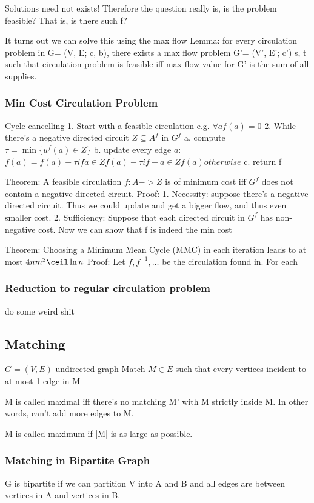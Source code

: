 \documentclass{article}
\begin{document}
Solutions need not exists!
Therefore the question really is, is the problem feasible?  That is, is there
such f?

It turns out we can solve this using the max flow
Lemma: for every circulation problem in G= (V, E; c, b), there exists a max flow
problem G'= (V', E'; c') s, t such that circulation problem is feasible iff max
flow value for G' is the sum of all supplies.


\subsubsection{Min Cost Circulation Problem}
Cycle cancelling
1. Start with a feasible circulation e.g. $\forall a f(a) = 0$
2. While there's a negative directed circuit $Z\subseteq A^f$ in $G^f$
   a. compute $\tau = \min \{u^f(a) \in Z\}$
   b. update every edge $a$: $f(a) = f(a) + \tau if a \in Z f(a) - \tau if -a \in Z f(a) otherwise$
   c. return f

Theorem: A feasible circulation $f: A -> Z$ is of minimum cost iff
$G^f$ does not contain a negative directed circuit.
Proof:
1. Necessity: suppose there's a negative directed circuit. Thus we
could update and get a bigger flow, and thus even smaller cost.
2. Sufficiency: Suppose that each directed circuit in $G^f$ has non-negative cost.  Now we can show that f is indeed the min cost

Theorem: Choosing a Minimum Mean Cycle (MMC) in each iteration leads to at most $4nm^2\ceil \ln n$
Proof:
Let $f, f^{-1},\ldots$ be the circulation found in.  For each 

\subsubsection{Reduction to regular circulation problem}
do some weird shit



\subsection{Matching}
$G=(V,E)$ undirected graph
Match $M\in E$ such that every vertices incident to at most 1 edge in M

M is called maximal iff there's no matching M' with M strictly inside M.  In
other words, can't add more edges to M.

M is called maximum if |M| is as large as possible.

\subsubsection{Matching in Bipartite Graph}
G is bipartite if we can partition V into A and B and all edges are between
vertices in A and vertices in B.
\end{document}
